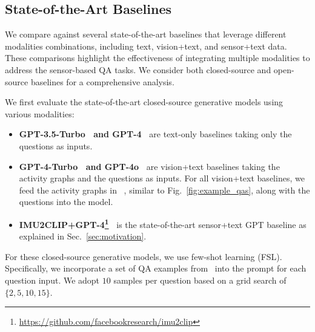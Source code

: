 \vspace{-2mm}
\subsection{State-of-the-Art Baselines}



We compare \Method against several state-of-the-art baselines that leverage different modalities combinations, including \textcolor{mygreen}{text}, \textcolor{myred}{vision+text}, and \textcolor{myblue}{sensor+text} data. These comparisons highlight the effectiveness of integrating multiple modalities to address the sensor-based QA tasks. 
We consider both closed-source and open-source baselines for a comprehensive analysis.


We first evaluate the state-of-the-art closed-source generative models using various modalities:
\begin{itemize}[topsep=0pt, itemsep=0pt]
    \item \textbf{GPT-3.5-Turbo~\cite{gpt-3.5} and GPT-4~\cite{gpt-4}} are \textcolor{mygreen}{text-only} baselines taking only the questions as inputs.
    \item \textbf{GPT-4-Turbo~\cite{gpt-4} and GPT-4o~\cite{gpt-4}} are \textcolor{myred}{vision+text} baselines taking the activity graphs and the questions as inputs. For all \textcolor{myred}{vision+text} baselines, we feed the activity graphs in \Dataset~\citesensorqa, similar to Fig.~\ref{fig:example_qas}, along with the questions into the model.
    \item \textbf{IMU2CLIP+GPT-4\footnote{\url{https://github.com/facebookresearch/imu2clip}}~\cite{moon-etal-2023-imu2clip}} is the state-of-the-art \textcolor{myblue}{sensor+text} GPT baseline as explained in Sec.~\ref{sec:motivation}.
\end{itemize}
For these closed-source generative models, we use few-shot learning (FSL). Specifically, we incorporate a set of QA examples from \Dataset~\citesensorqa into the prompt for each question input. We adopt $10$ samples per question based on a grid search of $\{2, 5, 10, 15\}$.






